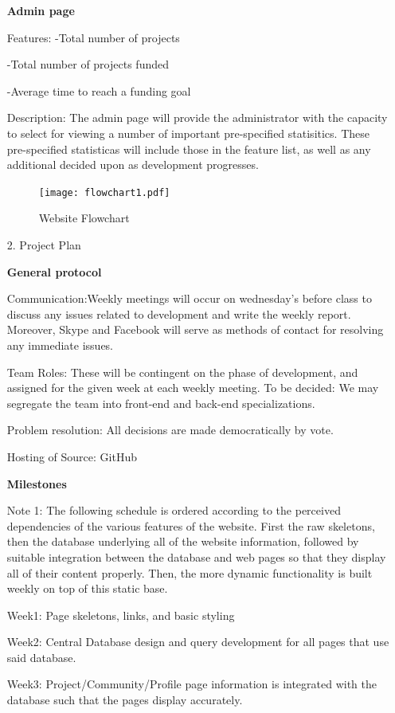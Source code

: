 \documentclass[12pt]{article}
\begin{document}
\begin{enumerate}
\textbf{Admin page}

Features:
-Total number of projects

-Total number of projects funded

-Average time to reach a funding goal

Description:
The admin page will provide the administrator with the capacity to select for viewing a number of important pre-specified statisitics.
These pre-specified statisticas will include those in the feature list, as well as any additional decided upon as development progresses.


\begin{figure}[ht!]
\centering
\texttt{[image: flowchart1.pdf]}
\caption{Website Flowchart \label{overflow}}
\end{figure}


\item[2.] Project Plan

\textbf{General protocol}

Communication:Weekly meetings will occur on wednesday's before class to discuss any issues related to development and write the weekly report. Moreover, Skype and Facebook will serve as methods of contact for resolving any immediate issues.

Team Roles: These will be contingent on the phase of development, and assigned for the given week at each weekly meeting. To be decided: We may segregate the team into front-end and back-end specializations.

Problem resolution: All decisions are made democratically by vote.

Hosting of Source: GitHub

\textbf{Milestones}

Note 1: The following schedule is ordered according to the perceived dependencies of the various features of the website. First the raw skeletons, then the database underlying all of the website information, followed by suitable integration between the database and web pages so that they display all of their content properly. Then, the more dynamic functionality is built weekly on top of this static base. 

Week1: Page skeletons, links, and basic styling

Week2: Central Database design and query development for all pages that use said database.

Week3: Project/Community/Profile page information is integrated with the database such that the pages display accurately.


\end{enumerate}
\end{document}
